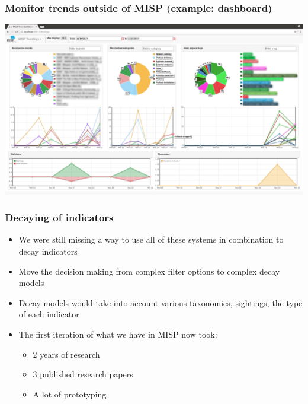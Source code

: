 \begin{frame}
  \frametitle{Monitor trends outside of MISP (example: dashboard)}
  \begin{center}
    \includegraphics[scale=0.2]{dashboard-trendings.png}
  \end{center}
\end{frame}

\begin{frame}
  \frametitle{Decaying of indicators}
  \begin{itemize}
    \item We were still missing a way to use all of these systems in combination to decay indicators
    \item Move the decision making from complex filter options to complex decay models
    \item Decay models would take into account various taxonomies, sightings, the type of each indicator
    \item The first iteration of what we have in MISP now took:
    \begin{itemize}
       \item 2 years of research
       \item 3 published research papers
       \item A lot of prototyping
    \end{itemize}
  \end{itemize}
\end{frame}


